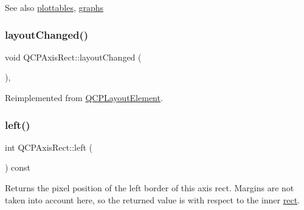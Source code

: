 \begin{DoxySeeAlso}{See also}
\mbox{\hyperlink{class_q_c_p_axis_rect_a587d073a97b27bc7293fab4b2774ad59}{plottables}}, \mbox{\hyperlink{class_q_c_p_axis_rect_a2d9ded3eca97be1fcb5867949391bb88}{graphs}} 
\end{DoxySeeAlso}
\mbox{\label{class_q_c_p_axis_rect_a575e38ac71a21906dc2d7b3364db2d62}} 
\subsubsection{\texorpdfstring{layoutChanged()}{layoutChanged()}}
{\footnotesize\ttfamily void Q\+C\+P\+Axis\+Rect\+::layout\+Changed (\begin{DoxyParamCaption}{ }\end{DoxyParamCaption})\hspace{0.3cm}{\ttfamily [protected]}, {\ttfamily [virtual]}}



Reimplemented from \mbox{\hyperlink{class_q_c_p_layout_element_a765f041a73af0c2de41b41a5a03e31a4}{Q\+C\+P\+Layout\+Element}}.

\mbox{\label{class_q_c_p_axis_rect_afb4a3de02046b20b9310bdb8fca781c3}} 
\subsubsection{\texorpdfstring{left()}{left()}}
{\footnotesize\ttfamily int Q\+C\+P\+Axis\+Rect\+::left (\begin{DoxyParamCaption}{ }\end{DoxyParamCaption}) const\hspace{0.3cm}{\ttfamily [inline]}}

Returns the pixel position of the left border of this axis rect. Margins are not taken into account here, so the returned value is with respect to the inner \mbox{\hyperlink{class_q_c_p_layout_element_a208effccfe2cca4a0eaf9393e60f2dd4}{rect}}. \mbox{\label{class_q_c_p_axis_rect_a9cd27ad8c5cfb49aefd9dbb30def4beb}} 
